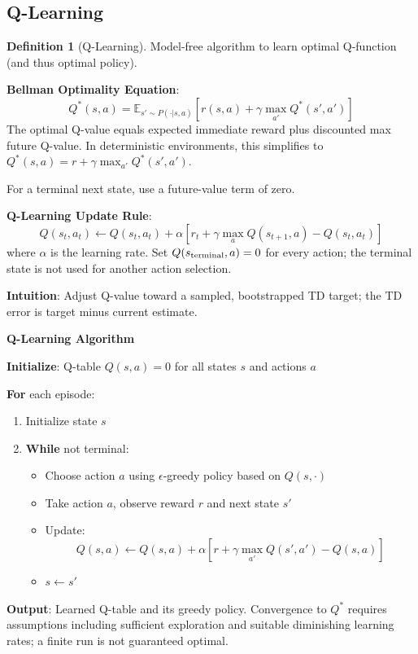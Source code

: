 \documentclass[11pt,twoside]{article}
\numberwithin{equation}{section}
\newcommand{\E}{\mathbb{E}}
\theoremstyle{plain}
\theoremstyle{definition}
\newtheorem{definition}[theorem]{Definition}
\theoremstyle{remark}
\begin{document}
\subsection{Q-Learning}

\begin{definition}[Q-Learning]
Model-free algorithm to learn optimal Q-function (and thus optimal policy).

\textbf{Bellman Optimality Equation}:
\[
Q^*(s,a) = \E_{s' \sim P(\cdot|s,a)}\left[r(s,a) + \gamma \max_{a'} Q^*(s', a')\right]
\]
The optimal Q-value equals expected immediate reward plus discounted max future Q-value. In deterministic environments, this simplifies to $Q^*(s,a) = r + \gamma \max_{a'} Q^*(s', a')$.

For a terminal next state, use a future-value term of zero.

\textbf{Q-Learning Update Rule}:
\[
Q(s_t, a_t) \leftarrow Q(s_t, a_t) + \alpha\left[r_t + \gamma \max_{a} Q(s_{t+1}, a) - Q(s_t, a_t)\right]
\]
where $\alpha$ is the learning rate. Set $Q(s_{\rm terminal},a)=0$ for every action; the terminal state is not used for another action selection.

\textbf{Intuition}: Adjust Q-value toward a sampled, bootstrapped TD target; the TD error is target minus current estimate.
\end{definition}

\begin{algorithmbox}
\textbf{Q-Learning Algorithm}

\textbf{Initialize}: Q-table $Q(s,a) = 0$ for all states $s$ and actions $a$

\textbf{For} each episode:
\begin{enumerate}
\item Initialize state $s$
\item \textbf{While} not terminal:
\begin{itemize}
\item Choose action $a$ using $\epsilon$-greedy policy based on $Q(s, \cdot)$
\item Take action $a$, observe reward $r$ and next state $s'$
\item Update: 
\[
Q(s,a) \leftarrow Q(s,a) + \alpha\left[r + \gamma \max_{a'} Q(s',a') - Q(s,a)\right]
\]
\item $s \leftarrow s'$
\end{itemize}
\end{enumerate}

\textbf{Output}: Learned Q-table and its greedy policy. Convergence to $Q^*$ requires assumptions including sufficient exploration and suitable diminishing learning rates; a finite run is not guaranteed optimal.
\end{algorithmbox}
\end{document}
